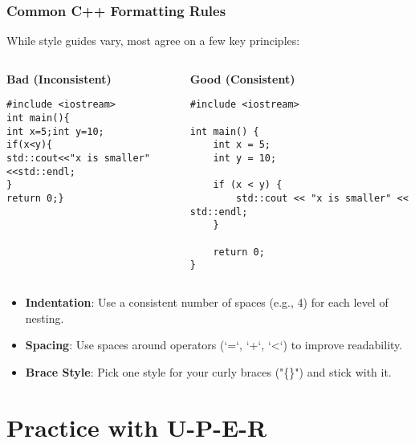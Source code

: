 \documentclass{beamer}
\begin{document}
\begin{frame}[fragile]
\frametitle{Common C++ Formatting Rules}
While style guides vary, most agree on a few key principles:

\begin{columns}[T]
\begin{column}{0.5\textwidth}
    \textbf{Bad (Inconsistent)}
    \begin{verbatim}
#include <iostream>
int main(){
int x=5;int y=10;
if(x<y){
std::cout<<"x is smaller"<<std::endl;
}
return 0;}
    \end{verbatim}
\end{column}
\begin{column}{0.5\textwidth}
    \textbf{Good (Consistent)}
    \begin{verbatim}
#include <iostream>

int main() {
    int x = 5;
    int y = 10;

    if (x < y) {
        std::cout << "x is smaller" << std::endl;
    }

    return 0;
}
    \end{verbatim}
\end{column}
\end{columns}

\begin{itemize}
    \item \textbf{Indentation}: Use a consistent number of spaces (e.g., 4) for each level of nesting.
    \item \textbf{Spacing}: Use spaces around operators (`=`, `+`, `<`) to improve readability.
    \item \textbf{Brace Style}: Pick one style for your curly braces ("\{\}") and stick with it.
\end{itemize}
\end{frame}

\section{Practice with U-P-E-R}
\end{document}
